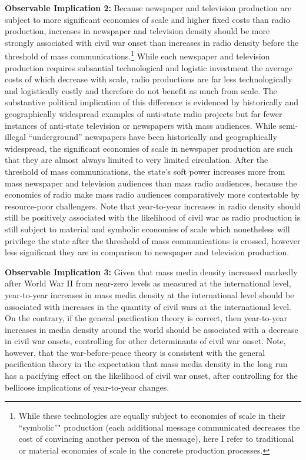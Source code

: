 \documentclass[11pt,article,oneside]{memoir}
\begin{document}
\textbf{Observable Implication 2:} Because newspaper and television
production are subject to more significant economies of scale and higher
fixed costs than radio production, increases in newspaper and television
density should be more strongly associated with civil war onset than
increases in radio density before the threshold of mass
communications.\footnote{While these technologies are equally subject to
  economies of scale in their ``symbolic''" production (each additional
  message communicated decreases the cost of convincing another person
  of the message), here I refer to traditional or material economies of
  scale in the concrete production processes.} While each newspaper and
television production requires subsantial technological and logistic
investment the average costs of which decrease with scale, radio
productions are far less technologically and logistically costly and
therefore do not benefit as much from scale. The substantive political
implication of this difference is evidenced by historically and
geographically widespread examples of anti-state radio projects but far
fewer instances of anti-state television or newspapers with mass
audiences. While semi-illegal ``underground'' newspapers have been
historically and geographically widespread, the significant economies of
scale in newspaper production are such that they are almost always
limited to very limited circulation. After the threshold of mass
communications, the state's soft power increases more from mass
newspaper and television audiences than mass radio audiences, because
the economics of radio make mass radio audiences comparatively more
contestable by resource-poor challengers. Note that year-to-year
increases in radio density should still be positively associated with
the likelihood of civil war as radio production is still subject to
material and symbolic economies of scale which nonetheless will
privilege the state after the threshold of mass communications is
crossed, however less significant they are in comparison to newspaper
and television production.

\textbf{Observable Implication 3:} Given that mass media density
increased markedly after World War II from near-zero levels as measured
at the international level, year-to-year increases in mass media density
at the international level should be associated with increases in the
quantity of civil wars at the international level. On the contrary, if
the general pacification theory is correct, then year-to-year increases
in media density around the world should be associated with a decrease
in civil war onsets, controlling for other determinants of civil war
onset. Note, however, that the war-before-peace theory is consistent
with the general pacification theory in the expectation that mass media
density in the long run has a pacifying effect on the likelihood of
civil war onset, after controlling for the bellicose implications of
year-to-year changes.
\end{document}
